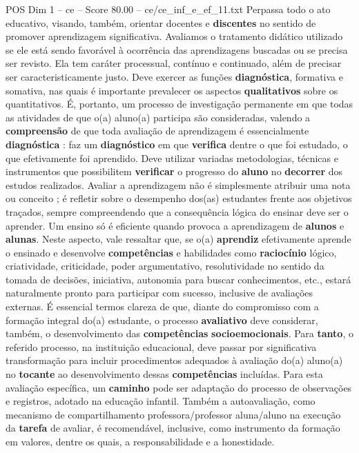 \begin{textsample}{POS Dim 1 – ce – Score 80.00 – ce/ce\_inf\_e\_ef\_11.txt}
Perpassa todo o ato educativo, visando, também, orientar docentes e \textbf{discentes} no sentido de promover aprendizagem significativa.
Avaliamos o tratamento didático utilizado se ele está sendo favorável à ocorrência das aprendizagens buscadas ou se precisa ser revisto.
Ela tem caráter processual, contínuo e continuado, além de precisar ser caracteristicamente justo.
Deve exercer as funções \textbf{diagnóstica}, formativa e somativa, nas quais é importante prevalecer os aspectos \textbf{qualitativos} sobre os quantitativos.
É, portanto, um processo de investigação permanente em que todas as atividades de que o(a) aluno(a) participa são consideradas, valendo a \textbf{compreensão} de que toda avaliação de aprendizagem é essencialmente \textbf{diagnóstica} : faz um \textbf{diagnóstico} em que \textbf{verifica} dentre o que foi estudado, o que efetivamente foi aprendido.
Deve utilizar variadas metodologias, técnicas e instrumentos que possibilitem \textbf{verificar} o progresso do \textbf{aluno} no \textbf{decorrer} dos estudos realizados.
Avaliar a aprendizagem não é simplesmente atribuir uma nota ou conceito ; é refletir sobre o desempenho dos(as) estudantes frente aos objetivos traçados, sempre compreendendo que a consequência lógica do ensinar deve ser o aprender.
Um ensino só é eficiente quando provoca a aprendizagem de \textbf{alunos} e \textbf{alunas}.
Neste aspecto, vale ressaltar que, se o(a) \textbf{aprendiz} efetivamente aprende o ensinado e desenvolve \textbf{competências} e habilidades como \textbf{raciocínio} lógico, criatividade, criticidade, poder argumentativo, resolutividade no sentido da tomada de decisões, iniciativa, autonomia para buscar conhecimentos, etc., estará naturalmente pronto para participar com sucesso, inclusive de avaliações externas.
É essencial termos clareza de que, diante do compromisso com a formação integral do(a) estudante, o processo \textbf{avaliativo} deve considerar, também, o desenvolvimento das \textbf{competências} \textbf{socioemocionais}.
Para \textbf{tanto}, o referido processo, na instituição educacional, deve passar por significativa transformação para incluir procedimentos adequados à avaliação do(a) aluno(a) no \textbf{tocante} ao desenvolvimento dessas \textbf{competências} incluídas.
Para esta avaliação específica, um \textbf{caminho} pode ser adaptação do processo de observações e registros, adotado na educação infantil.
Também a autoavaliação, como mecanismo de compartilhamento professora/professor aluna/aluno na execução da \textbf{tarefa} de avaliar, é recomendável, inclusive, como instrumento da formação em valores, dentre os quais, a responsabilidade e a honestidade.

\end{textsample}
